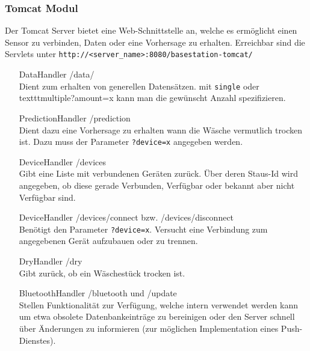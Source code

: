 \subsubsection{Tomcat Modul}
Der Tomcat Server bietet eine Web-Schnittstelle an, welche es ermöglicht einen Sensor zu verbinden, Daten oder eine Vorhersage zu erhalten.
Erreichbar sind die Servlets unter \texttt{http://<server\_name>:8080/basestation-tomcat/}
	
\begin{enumerate}
	\item[DataHandler] /data/ \\
	Dient zum erhalten von generellen Datensätzen. mit \texttt{single} oder texttt{multiple?amount=x} kann man die gewünscht Anzahl spezifizieren.
	\item[PredictionHandler] /prediction \\
	Dient dazu eine Vorhersage zu erhalten wann die Wäsche vermutlich trocken ist. Dazu muss der Parameter \texttt{?device=x} angegeben werden.
	\item[DeviceHandler] /devices \\
	Gibt eine Liste mit verbundenen Geräten zurück. Über deren Staus-Id wird angegeben, ob diese gerade Verbunden, Verfügbar oder bekannt aber nicht Verfügbar sind.
	\item[DeviceHandler] /devices/connect bzw. /devices/disconnect \\
	Benötigt den Parameter \texttt{?device=x}. Versucht eine Verbindung zum angegebenen Gerät aufzubauen oder zu trennen.
	\item[DryHandler] /dry \\
	Gibt zurück, ob ein Wäschestück trocken ist.
	\item[BluetoothHandler] /bluetooth und /update \\
	Stellen Funktionalität zur Verfügung, welche intern verwendet werden kann um etwa obsolete Datenbankeinträge zu bereinigen oder den Server schnell über Änderungen zu informieren (zur möglichen Implementation eines Push-Dienstes).
\end{enumerate}


